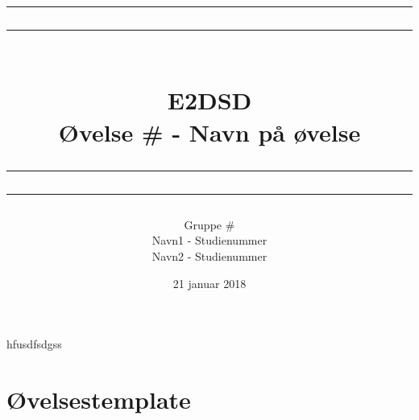 \documentclass[12pt,a4paper]{article}
\newcommand\mymaketitle[1]{
   \rule{\textwidth}{1.6pt}\vspace*{-\baselineskip}\vspace*{2pt}
   \rule{\textwidth}{0.4pt}
   \\  
   \huge \bf #1\\
   \vspace{-8pt}
   \rule{\textwidth}{0.4pt}\vspace*{-\baselineskip}\vspace{3.2pt}
   \rule{\textwidth}{1.6pt}
}
\begin{document}
\title{
	\mymaketitle{E2DSD\\Øvelse \# - Navn på øvelse}
}
\author{
	Gruppe \#\\
	Navn1 - Studienummer\\
	Navn2 - Studienummer
}
\date{21 januar 2018}

\maketitle


hfusdfsdgss
\section{Øvelsestemplate}


\end{document}
